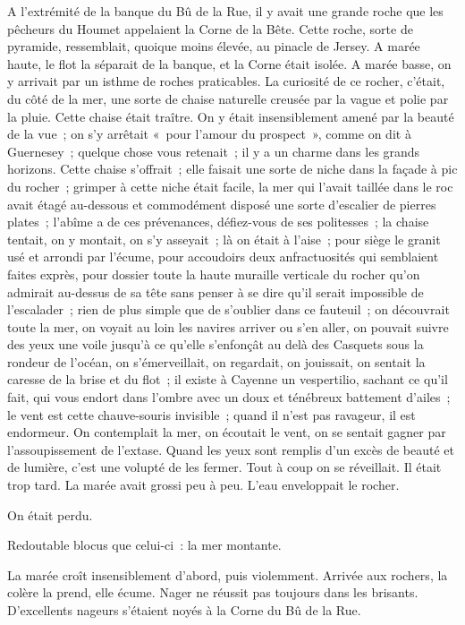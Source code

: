 \documentclass[french,twoside]{book} %
\begin{document}
A l’extrémité de la banque du Bû de la Rue, il y avait une grande roche que les pêcheurs du Houmet appelaient la Corne de la Bête. Cette roche, sorte de pyramide, ressemblait, quoique moins élevée, au pinacle de Jersey. A marée haute, le flot la séparait de la banque, et la Corne était isolée. A marée basse, on y arrivait par un isthme de roches praticables. La curiosité de ce rocher, c’était, du côté de la mer, une sorte de chaise naturelle creusée par la vague et polie par la pluie. Cette chaise était traître. On y était insensiblement amené par la beauté de la vue ; on s’y arrêtait « pour l’amour du prospect », comme on dit à Guernesey ; quelque chose vous retenait ; il y a un charme dans les grands horizons. Cette chaise s’offrait ; elle faisait une sorte de niche dans la façade à pic du rocher ; grimper à cette niche était facile, la mer qui l’avait taillée dans le roc avait étagé au-dessous et commodément disposé une sorte d’escalier de pierres plates ; l’abîme a de ces prévenances, défiez-vous de ses politesses ; la chaise tentait, on y montait, on s’y asseyait ; là on était à l’aise ; pour siège le granit usé et arrondi par l’écume, pour accoudoirs deux anfractuosités qui semblaient faites exprès, pour dossier toute la haute muraille verticale du rocher qu’on admirait au-dessus de sa tête sans penser à se dire qu’il serait impossible de l’escalader ; rien de plus simple que de s’oublier dans ce fauteuil ; on découvrait toute la mer, on voyait au loin les navires arriver ou s’en  aller, on pouvait suivre des yeux une voile jusqu’à ce qu’elle s’enfonçât au delà des Casquets sous la rondeur de l’océan, on s’émerveillait, on regardait, on jouissait, on sentait la caresse de la brise et du flot ; il existe à Cayenne un vespertilio, sachant ce qu’il fait, qui vous endort dans l’ombre avec un doux et ténébreux battement d’ailes ; le vent est cette chauve-souris invisible ; quand il n’est pas ravageur, il est endormeur. On contemplait la mer, on écoutait le vent, on se sentait gagner par l’assoupissement de l’extase. Quand les yeux sont remplis d’un excès de beauté et de lumière, c’est une volupté de les fermer. Tout à coup on se réveillait. Il était trop tard. La marée avait grossi peu à peu. L’eau enveloppait le rocher.\par
On était perdu.\par
Redoutable blocus que celui-ci : la mer montante.\par
La marée croît insensiblement d’abord, puis violemment. Arrivée aux rochers, la colère la prend, elle écume. Nager ne réussit pas toujours dans les brisants. D’excellents nageurs s’étaient noyés à la Corne du Bû de la Rue.\par
\end{document}

